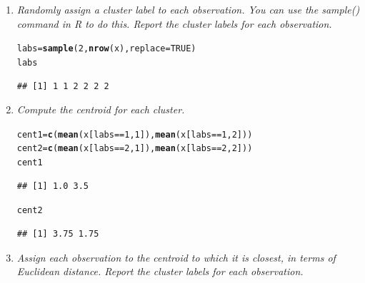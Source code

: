 \documentclass[11pt]{article}\usepackage[]{graphicx}\usepackage[]{color}
\makeatletter
\newcommand{\hlnum}[1]{\textcolor[rgb]{0.686,0.059,0.569}{#1}}%
\newcommand{\hlopt}[1]{\textcolor[rgb]{0,0,0}{#1}}%
\newcommand{\hlstd}[1]{\textcolor[rgb]{0.345,0.345,0.345}{#1}}%
\newcommand{\hlkwb}[1]{\textcolor[rgb]{0.69,0.353,0.396}{#1}}%
\newcommand{\hlkwc}[1]{\textcolor[rgb]{0.333,0.667,0.333}{#1}}%
\newcommand{\hlkwd}[1]{\textcolor[rgb]{0.737,0.353,0.396}{\textbf{#1}}}%
\newenvironment{kframe}{%
 \def\at@end@of@kframe{}%
 \ifinner\ifhmode%
  \def\at@end@of@kframe{\end{minipage}}%
  \begin{minipage}{\columnwidth}%
 \fi\fi%
 \def\FrameCommand##1{\hskip\@totalleftmargin \hskip-\fboxsep
 \colorbox{shadecolor}{##1}\hskip-\fboxsep
     \hskip-\linewidth \hskip-\@totalleftmargin \hskip\columnwidth}%
 \MakeFramed {\advance\hsize-\width
   \@totalleftmargin\z@ \linewidth\hsize
   \@setminipage}}%
 {\par\unskip\endMakeFramed%
 \at@end@of@kframe}
\newenvironment{knitrout}{}{} %
\makeatother
\begin{document}
\begin{enumerate}
\begin{enumerate}
\begin{knitrout}
{}



\end{knitrout}
	
				\item \textit{Randomly assign a cluster label to each observation. You can use the sample() command in R to do this. Report the cluster labels for each observation.}		

\begin{knitrout}
\color{fgcolor}\begin{kframe}
\begin{alltt}
\hlstd{labs} \hlkwb{=} \hlkwd{sample}\hlstd{(}\hlnum{2}\hlstd{,} \hlkwd{nrow}\hlstd{(x),} \hlkwc{replace}\hlstd{=}\hlnum{TRUE}\hlstd{)}
\hlstd{labs}
\end{alltt}
\begin{verbatim}
## [1] 1 1 2 2 2 2
\end{verbatim}
\end{kframe}
\end{knitrout}
				
				\item \textit{Compute the centroid for each cluster.}
\begin{knitrout}
\color{fgcolor}\begin{kframe}
\begin{alltt}
\hlstd{cent1} \hlkwb{=} \hlkwd{c}\hlstd{(}\hlkwd{mean}\hlstd{(x[labs} \hlopt{==} \hlnum{1}\hlstd{,} \hlnum{1}\hlstd{]),} \hlkwd{mean}\hlstd{(x[labs} \hlopt{==} \hlnum{1}\hlstd{,} \hlnum{2}\hlstd{]))}
\hlstd{cent2} \hlkwb{=} \hlkwd{c}\hlstd{(}\hlkwd{mean}\hlstd{(x[labs} \hlopt{==} \hlnum{2}\hlstd{,} \hlnum{1}\hlstd{]),} \hlkwd{mean}\hlstd{(x[labs} \hlopt{==} \hlnum{2}\hlstd{,} \hlnum{2}\hlstd{]))}
\hlstd{cent1}
\end{alltt}
\begin{verbatim}
## [1] 1.0 3.5
\end{verbatim}
\begin{alltt}
\hlstd{cent2}
\end{alltt}
\begin{verbatim}
## [1] 3.75 1.75
\end{verbatim}
\end{kframe}
\end{knitrout}

				\item \textit{Assign each observation to the centroid to which it is closest, in terms of Euclidean distance. Report the cluster labels for each observation.}





\end{enumerate}
\end{enumerate}
\end{document}
